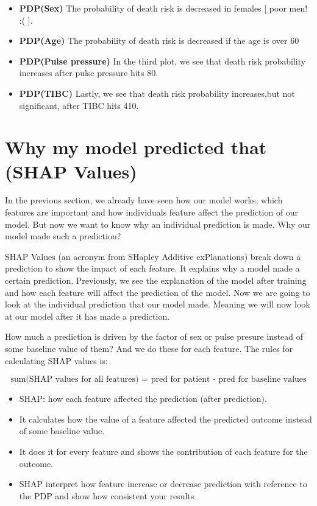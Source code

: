 \documentclass[5 pt]{article}
\begin{document}
\begin{itemize}
    \item \textbf{PDP(Sex)} The probability of death risk is decreased in females [ poor men! :( ].
    \item \textbf{PDP(Age)} The probability of death risk is decreased if the age is over 60
    \item \textbf{PDP(Pulse pressure)} In the third plot, we see that death risk probability increases after pulse pressure hits 80.
    \item \textbf{PDP(TIBC)} Lastly, we see that death risk probability increases,but not significant, after TIBC hits 410.
\end{itemize}



\section{Why my model predicted that (SHAP Values)}

In the previous section, we already have seen how our model works, which features are important and how individuals feature affect the prediction of our model. But now we want to know why an individual prediction is made. Why our model made such a prediction?

SHAP Values (an acronym from SHapley Additive exPlanations) break down a prediction to show the impact of each feature. It explains why a model made a certain prediction. Previously, we see the explanation of the model after training and how each feature will affect the prediction of the model. Now we are going to look at the individual prediction that our model made. Meaning we will now look at our model after it has made a prediction.



How much a prediction is driven by the factor of sex or pulse presure instead of some baseline value of them? And we do these for each feature. The rules for calculating SHAP values is:

$$\textrm{sum(SHAP values for all features) = pred for patient - pred for baseline values}
$$

\begin{itemize}
    \item SHAP: how each feature affected the prediction (after prediction).
\item It calculates how the value of a feature affected the predicted outcome instead of some baseline value.
\item It does it for every feature and shows the contribution of each feature for the outcome.
\item SHAP interpret how feature increase or decrease prediction with reference to the PDP and show how consistent your results
\end{itemize}
\end{document}

